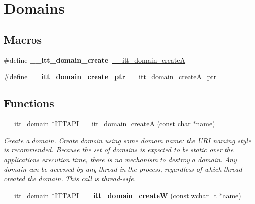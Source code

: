 \hypertarget{group__domains}{}\section{Domains}
\label{group__domains}
\subsection*{Macros}
\begin{DoxyCompactItemize}
\item 
\hypertarget{group__domains_gaaca2154ec24d785edec256a9296220a4}{}\#define {\bfseries \+\_\+\+\_\+itt\+\_\+domain\+\_\+create}~\hyperlink{group__domains_gae8d5e8af6425224626841526000e2ca2}{\+\_\+\+\_\+itt\+\_\+domain\+\_\+create\+A}\label{group__domains_gaaca2154ec24d785edec256a9296220a4}

\item 
\hypertarget{group__domains_gaf24d68da0ebd8a2773bb4a7d3875df14}{}\#define {\bfseries \+\_\+\+\_\+itt\+\_\+domain\+\_\+create\+\_\+ptr}~\+\_\+\+\_\+itt\+\_\+domain\+\_\+create\+A\+\_\+ptr\label{group__domains_gaf24d68da0ebd8a2773bb4a7d3875df14}

\end{DoxyCompactItemize}
\subsection*{Functions}
\begin{DoxyCompactItemize}
\item 
\+\_\+\+\_\+itt\+\_\+domain $\ast$I\+T\+T\+A\+P\+I \hyperlink{group__domains_gae8d5e8af6425224626841526000e2ca2}{\+\_\+\+\_\+itt\+\_\+domain\+\_\+create\+A} (const char $\ast$name)
\begin{DoxyCompactList}\small\item\em Create a domain. Create domain using some domain name\+: the U\+R\+I naming style is recommended. Because the set of domains is expected to be static over the application\textquotesingle{}s execution time, there is no mechanism to destroy a domain. Any domain can be accessed by any thread in the process, regardless of which thread created the domain. This call is thread-\/safe. \end{DoxyCompactList}\item 
\hypertarget{group__domains_gad53a1a711a2ceaaee028f64296c89a25}{}\+\_\+\+\_\+itt\+\_\+domain $\ast$I\+T\+T\+A\+P\+I {\bfseries \+\_\+\+\_\+itt\+\_\+domain\+\_\+create\+W} (const wchar\+\_\+t $\ast$name)\label{group__domains_gad53a1a711a2ceaaee028f64296c89a25}

\end{DoxyCompactItemize}


